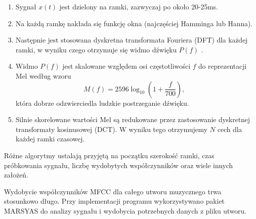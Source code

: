 \begin{enumerate}
 \item Sygnał $x(t)$ jest dzielony na ramki, zazwyczaj po około 20-25ms.
 \item Na każdą ramkę nakłada się funkcję okna (najczęściej Hamminga
lub Hanna).
 \item Następnie jest stosowana dyskretna transformata Fouriera (DFT) dla każdej
ramki, w wyniku czego otrzymuje się widmo dźwięku $P(f)$ %
.%

 \item Widmo $P(f)$ jest skalowane względem osi częstotliwości $f$ do
reprezentacji Mel według wzoru
\begin{equation}
 M(f)=2596\log_{10}\left(1+\frac{f}{700}\right) ,
\end{equation} 
która dobrze odzwierciedla ludzkie postrzeganie dźwięku.
 \item Silnie skorelowane wartości Mel są redukowane przez zastosowanie
dyskretnej transformaty kosinusowej (DCT). W wyniku tego otrzymujemy $N$ cech
dla każdej ramki czasowej.
\end{enumerate}
Różne algorytmy ustalają przyjętą na początku szerokość ramki, czas
próbkowania sygnału, liczbę wydobytych współczynników oraz wiele innych założeń.

Wydobycie współczynników MFCC dla całego utworu muzycznego trwa stosunkowo
długo. Przy implementacji programu wykorzystywano pakiet MARSYAS do
analizy sygnału i wydobycia potrzebnych danych z pliku utworu. 

